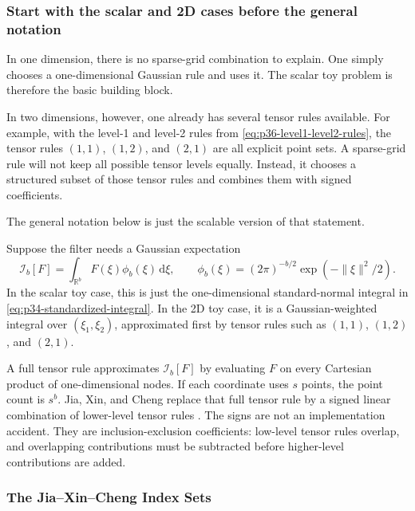 \documentclass[11pt]{article}
\numberwithin{equation}{section}
\newcommand{\R}{\mathbb R}
\newcommand{\dd}{\,\mathrm d}
\begin{document}
\subsubsection{Start with the scalar and 2D cases before the general notation}

In one dimension, there is no sparse-grid combination to explain.  One simply
chooses a one-dimensional Gaussian rule and uses it.  The scalar toy problem is
therefore the basic building block.

In two dimensions, however, one already has several tensor rules available.  For
example, with the level-1 and level-2 rules from
\eqref{eq:p36-level1-level2-rules}, the tensor rules \((1,1)\), \((1,2)\), and
\((2,1)\) are all explicit point sets.  A sparse-grid rule will not keep all
possible tensor levels equally.  Instead, it chooses a structured subset of
those tensor rules and combines them with signed coefficients.

The general notation below is just the scalable version of that statement.

Suppose the filter needs a Gaussian expectation
\begin{equation}
  \mathcal I_b[F]
  =
  \int_{\R^b}F(\xi)\phi_b(\xi)\dd\xi,
  \qquad
  \phi_b(\xi)=(2\pi)^{-b/2}\exp(-\|\xi\|^2/2).
  \label{eq:p32-gaussian-integral-target}
\end{equation}
In the scalar toy case, this is just the one-dimensional standard-normal integral
in \eqref{eq:p34-standardized-integral}.  In the 2D toy case, it is a
Gaussian-weighted integral over \((\xi_1,\xi_2)\), approximated first by tensor
rules such as \((1,1)\), \((1,2)\), and \((2,1)\).

A full tensor rule approximates \(\mathcal I_b[F]\) by evaluating \(F\) on
every Cartesian product of one-dimensional nodes.  If each coordinate uses
\(s\) points, the point count is \(s^b\).  Jia, Xin, and Cheng replace that
full tensor rule by a signed linear combination of lower-level tensor rules
\cite[Section 3.1]{jia2012sparsegrid}.  The signs are not an implementation
accident.  They are inclusion-exclusion coefficients: low-level tensor rules
overlap, and overlapping contributions must be subtracted before higher-level
contributions are added.

\subsubsection{The Jia--Xin--Cheng Index Sets}
\label{subsec:p32-source-index-sets}
\end{document}
